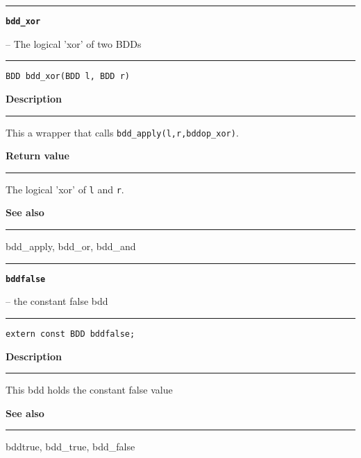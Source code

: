 \vspace{8ex}
\begin{minipage}{\textwidth}

\noindent\begin{minipage}{\textwidth}
\rule{\textwidth}{0.5mm}
{\tt\bf bdd\_xor }
\--- The logical 'xor' of two BDDs  \hspace{\fill}
\\\rule[1.5ex]{\textwidth}{0.5mm}
\end{minipage}

\noindent\begin{verbatim}
BDD bdd_xor(BDD l, BDD r) 
\end{verbatim}

\vspace{\parsep}\noindent
{\bf Description}\\\rule[1.5ex]{\textwidth}{0.2mm}\vspace{-1.5ex}\setlength{\parindent}{1em}
This a wrapper that calls {\tt bdd\_apply(l,r,bddop\_xor)}. 

\setlength{\parindent}{0em}\vspace{\parsep}\vspace{\baselineskip}\noindent
{\bf Return value}\\\rule[1.5ex]{\textwidth}{0.2mm}\vspace{-1.5ex}
The logical 'xor' of {\tt l} and {\tt r}. 

\vspace{\parsep}\vspace{\baselineskip}\noindent
{\bf See also}\\\rule[1.5ex]{\textwidth}{0.2mm}\vspace{-1.5ex}
bdd\_apply, bdd\_or, bdd\_and 
\end{minipage}
\vspace{8ex}
\begin{minipage}{\textwidth}

\noindent\begin{minipage}{\textwidth}
\rule{\textwidth}{0.5mm}
{\tt\bf bddfalse}
\--- the constant false bdd  \hspace{\fill}
\\\rule[1.5ex]{\textwidth}{0.5mm}
\end{minipage}

\noindent\begin{verbatim}
extern const BDD bddfalse; 
\end{verbatim}

\vspace{\parsep}\noindent
{\bf Description}\\\rule[1.5ex]{\textwidth}{0.2mm}\vspace{-1.5ex}\setlength{\parindent}{1em}
This bdd holds the constant false value 

\vspace{\parsep}\vspace{\baselineskip}\noindent
{\bf See also}\\\rule[1.5ex]{\textwidth}{0.2mm}\vspace{-1.5ex}
bddtrue, bdd\_true, bdd\_false 
\end{minipage}
